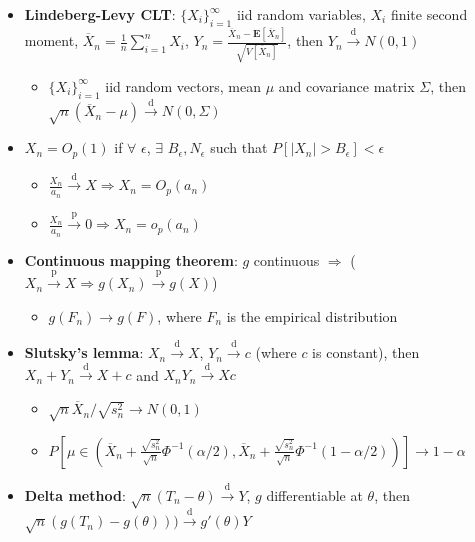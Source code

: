 \documentclass[12pt,english]{article}
\begin{document}
\begin{itemize}
	\item \textbf{Lindeberg-Levy CLT}: $\{ X_{i} \}_{i=1}^{\infty}$ iid random variables, $X_{i}$ finite second moment, $\overline{X}_{n} = \frac{1}{n} \sum_{i=1}^{n} X_{i}$, $Y_{n} = \frac{\overline{X}_{n} - \mathbf{E}[\overline{X}_{n}]}{\sqrt{V[\overline{X}_{n}]}}$, then $Y_{n} \overset{\text{d}}{\to} N(0,1)$
	\begin{itemize}
		\item $\{ X_{i} \}_{i=1}^{\infty}$ iid random vectors, mean $\mu$ and covariance matrix $\Sigma$, then $\sqrt{n} (\overline{X}_{n} - \mu) \overset{\text{d}}{\to} N(0, \Sigma)$
	\end{itemize}
	\item $X_{n} = O_{p}(1)$ if $\forall$ $\epsilon$, $\exists$ $B_{\epsilon}, N_{\epsilon}$ such that $P[|X_{n}| > B_{\epsilon}] < \epsilon$
	\begin{itemize}
		\item $\frac{X_{n}}{a_{n}} \overset{\text{d}}{\to} X \Rightarrow X_{n} = O_{p}(a_{n})$
		\item $\frac{X_{n}}{a_{n}} \overset{\text{p}}{\to} 0 \Rightarrow X_{n} = o_{p}(a_{n})$
	\end{itemize}
	\item \textbf{Continuous mapping theorem}: $g$ continuous $\Rightarrow$ ($X_{n} \overset{\text{p}}{\to} X \Rightarrow g(X_{n}) \overset{\text{p}}{\to} g(X)$)
	\begin{itemize}
		\item $g(F_{n}) \to g(F)$, where $F_{n}$ is the empirical distribution
	\end{itemize}
	\item \textbf{Slutsky's lemma}: $X_{n} \overset{\text{d}}{\to} X$, $Y_{n} \overset{\text{d}}{\to} c$ (where $c$ is constant), then $X_{n} + Y_{n} \overset{\text{d}}{\to} X + c$ and $X_{n} Y_{n} \overset{\text{d}}{\to} X c$
	\begin{itemize}
		\item $\sqrt{n} \overline{X}_{n} / \sqrt{s_{n}^{2}} \to N(0,1)$
		\item $P\left[\mu \in \left(\overline{X}_{n} + \frac{\sqrt{s_{n}^{2}}}{\sqrt{n}} \Phi^{-1}(\alpha/2), \overline{X}_{n} + \frac{\sqrt{s_{n}^{2}}}{\sqrt{n}} \Phi^{-1}(1 - \alpha/2) \right)\right] \to 1 - \alpha$
	\end{itemize}
	\item \textbf{Delta method}: $\sqrt{n} (T_{n} - \theta) \overset{\text{d}}{\to} Y$, $g$ differentiable at $\theta$, then $\sqrt{n} (g(T_{n}) - g(\theta))) \overset{\text{d}}{\to} g'(\theta) Y$

\end{itemize}
\end{document}
